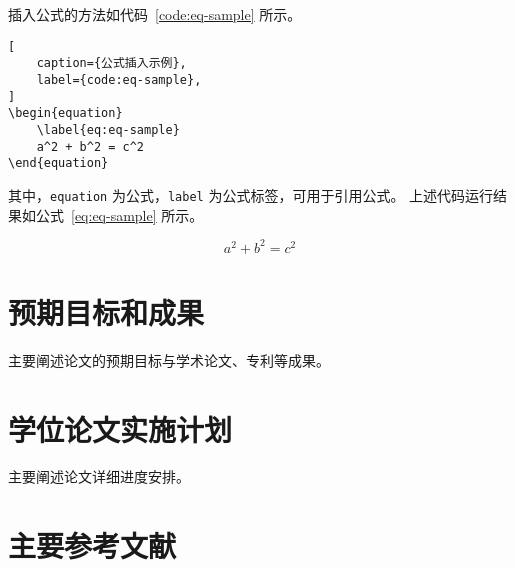 \documentclass[master,AutoFakeBold=true]{buaathesisproposal}
\begin{document}
插入公式的方法如代码~\ref{code:eq-sample} 所示。
\begin{lstlisting}[
    caption={公式插入示例},
    label={code:eq-sample},
]
\begin{equation}
    \label{eq:eq-sample}
    a^2 + b^2 = c^2
\end{equation}
\end{lstlisting}
其中，\verb|equation| 为公式，\verb|label| 为公式标签，可用于引用公式。
上述代码运行结果如公式~\ref{eq:eq-sample} 所示。

\begin{equation}
    \label{eq:eq-sample}
    a^2 + b^2 = c^2
\end{equation}


\section{预期目标和成果}
主要阐述论文的预期目标与学术论文、专利等成果。

\section{学位论文实施计划}
主要阐述论文详细进度安排。

\section{主要参考文献}
\nocite{*}

\end{document}
